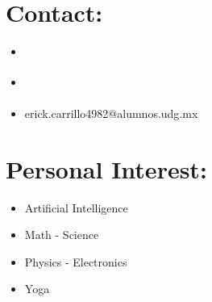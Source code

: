 \documentclass{article}
\begin{document}
\begin{minipage}[t]{8cm}
\begin{itemize}
  
\end{itemize}


\section*{Contact:}
\begin{itemize}
  \setlength\itemsep{0.01cm}
\item \href{https://www.linkedin.com/in/erick-alejandro-carrillo-lopez-988112219/}{\color{Blue}{Linkedin}}
\item \href{https://github.com/alecksandr26}{\color{Blue}{GitHub}}
\item erick.carrillo4982@alumnos.udg.mx
\end{itemize}
\section*{Personal Interest:}
\begin{itemize}
\item Artificial Intelligence
\item Math - Science
\item Physics - Electronics
\item Yoga
\end{itemize}

\end{minipage}
\space
\space
\space
\space
\space
\end{document}
